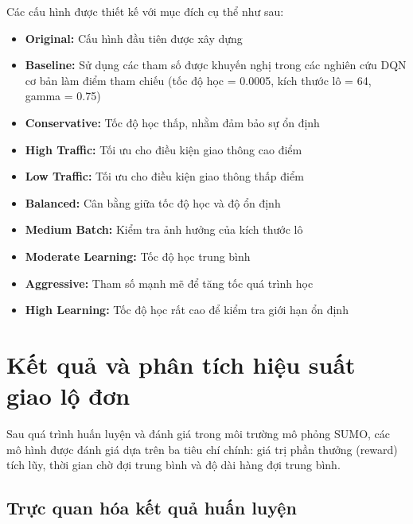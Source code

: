 Các cấu hình được thiết kế với mục đích cụ thể như sau:
\begin{itemize}
    \item \textbf{Original:} Cấu hình đầu tiên được xây dựng
    
    \item \textbf{Baseline:} Sử dụng các tham số được khuyến nghị trong 
        các nghiên cứu DQN cơ bản làm điểm tham chiếu (tốc độ học = 0.0005, kích thước lô = 64, 
        gamma = 0.75) 

    \item \textbf{Conservative:} Tốc độ học thấp, nhằm đảm bảo sự ổn định

    \item \textbf{High Traffic:} Tối ưu cho điều kiện giao thông
        cao điểm

    \item \textbf{Low Traffic:} Tối ưu cho điều kiện giao thông
        thấp điểm

    \item \textbf{Balanced:} Cân bằng giữa tốc độ học và độ ổn định

    \item \textbf{Medium Batch:} Kiểm tra ảnh hưởng của kích
        thước lô

    \item \textbf{Moderate Learning:} Tốc độ học trung bình


    \item \textbf{Aggressive:} Tham số mạnh mẽ để tăng tốc quá trình
        học

    \item \textbf{High Learning:} Tốc độ học rất cao để kiểm tra giới
        hạn ổn định
\end{itemize}

\section{Kết quả và phân tích hiệu suất giao lộ đơn}

Sau quá trình huấn luyện và đánh giá trong môi trường mô phỏng SUMO, các mô hình
được đánh giá dựa trên ba tiêu chí chính: giá trị phần thưởng (reward) tích lũy, thời
gian chờ đợi trung bình và độ dài hàng đợi trung bình.

\subsection{Trực quan hóa kết quả huấn luyện}

